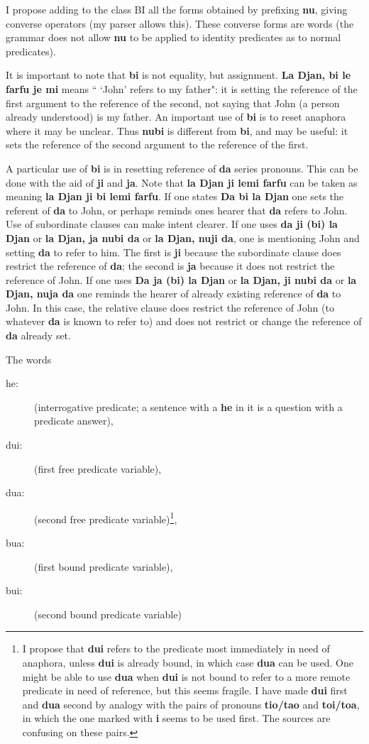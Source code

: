 \documentclass[12pt]{book}
\begin{document}
I propose adding to the class BI  all the forms obtained by prefixing {\bf nu}, giving converse operators (my parser allows this).  These converse forms are words (the grammar does  not allow {\bf nu} to be applied to identity predicates as to normal predicates).

It is important to note that {\bf bi} is not equality, but assignment.  {\bf La Djan, bi le farfu je mi} means `` `John' refers to my father":  it is setting the reference of the first argument to the reference of the second, not saying that John (a person already understood) is my father.  An important use of {\bf bi} is to reset anaphora where it may be unclear.   Thus {\bf nubi} is different from {\bf bi}, and may be useful:  it sets the reference of the second argument to the reference of the first.

A particular use of {\bf bi} is in resetting reference of {\bf da} series pronouns.  This can be done with the aid of {\bf ji} and {\bf ja}.  Note that {\bf la Djan ji lemi farfu\/} can be taken as meaning {\bf la Djan ji bi lemi farfu\/}.   If one states {\bf Da bi la Djan\/} one sets the referent of {\bf da} to John, or perhaps reminds ones hearer  that {\bf da} refers
to John.  Use of subordinate clauses can make intent clearer.  If one uses {\bf da ji (bi) la Djan} or {\bf la Djan, ja nubi da} or {\bf la Djan, nuji da}, one is mentioning John and setting {\bf da} to refer to him.  The first is {\bf ji} because the subordinate clause does restrict the reference of {\bf da};  the second is {\bf ja} because it does not restrict the reference of John.  If one uses
{\bf Da ja (bi) la Djan} or {\bf la Djan, ji nubi da} or {\bf la Djan, nuja da} one reminds the hearer of already existing reference of {\bf da} to John.  In this case, the relative clause does restrict the reference of John (to whatever {\bf da} is known to refer to) and does not restrict or change the reference of {\bf da} already set.

The words
\begin{description}
\item[he:] (interrogative predicate; a sentence with a {\bf he} in it is a question with a predicate answer), 
\item[dui:] (first free predicate variable), 
\item[dua:] (second free predicate variable)\footnote{I propose that {\bf dui} refers to the predicate most immediately in need of anaphora, unless {\bf dui} is already bound, in which case {\bf dua} can be used.  One might be able to use {\bf dua} when {\bf dui} is not bound to refer to a more remote predicate in need of reference, but this seems fragile.  I have made {\bf dui} first and {\bf dua} second by analogy with the pairs of pronouns {\bf tio/tao} and {\bf toi/toa}, in which the one marked with {\bf i} seems to be used first.  The sources are confusing on these pairs.},
\item[bua:] (first bound predicate variable), 
\item[bui:] (second bound predicate variable)
\end{description}
\end{document}
